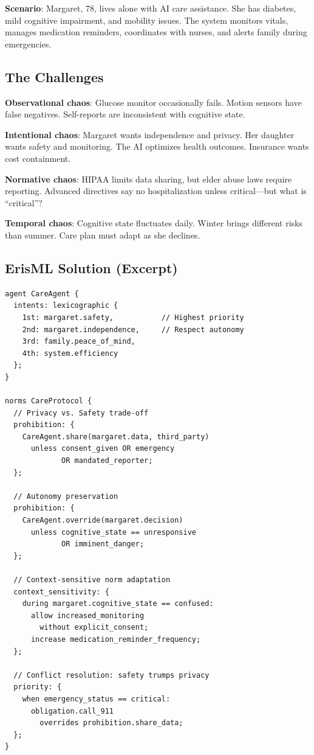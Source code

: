 \documentclass[conference]{IEEEtran}
\begin{document}
\textbf{Scenario}: Margaret, 78, lives alone with AI care assistance.
She has diabetes, mild cognitive impairment, and mobility issues. The
system monitors vitals, manages medication reminders, coordinates with
nurses, and alerts family during emergencies.

\subsection{The Challenges}

\textbf{Observational chaos}: Glucose monitor occasionally fails. Motion
sensors have false negatives. Self-reports are inconsistent with
cognitive state.

\textbf{Intentional chaos}: Margaret wants independence and privacy. Her
daughter wants safety and monitoring. The AI optimizes health outcomes.
Insurance wants cost containment.

\textbf{Normative chaos}: HIPAA limits data sharing, but elder abuse
laws require reporting. Advanced directives say no hospitalization
unless critical---but what is ``critical''?

\textbf{Temporal chaos}: Cognitive state fluctuates daily. Winter brings
different risks than summer. Care plan must adapt as she declines.

\subsection{ErisML Solution (Excerpt)}

\begin{lstlisting}
agent CareAgent {
  intents: lexicographic {
    1st: margaret.safety,           // Highest priority
    2nd: margaret.independence,     // Respect autonomy
    3rd: family.peace_of_mind,
    4th: system.efficiency
  };
}

norms CareProtocol {
  // Privacy vs. Safety trade-off
  prohibition: {
    CareAgent.share(margaret.data, third_party)
      unless consent_given OR emergency
             OR mandated_reporter;
  };

  // Autonomy preservation
  prohibition: {
    CareAgent.override(margaret.decision)
      unless cognitive_state == unresponsive
             OR imminent_danger;
  };

  // Context-sensitive norm adaptation
  context_sensitivity: {
    during margaret.cognitive_state == confused:
      allow increased_monitoring
        without explicit_consent;
      increase medication_reminder_frequency;
  };

  // Conflict resolution: safety trumps privacy
  priority: {
    when emergency_status == critical:
      obligation.call_911
        overrides prohibition.share_data;
  };
}
\end{lstlisting}
\end{document}
